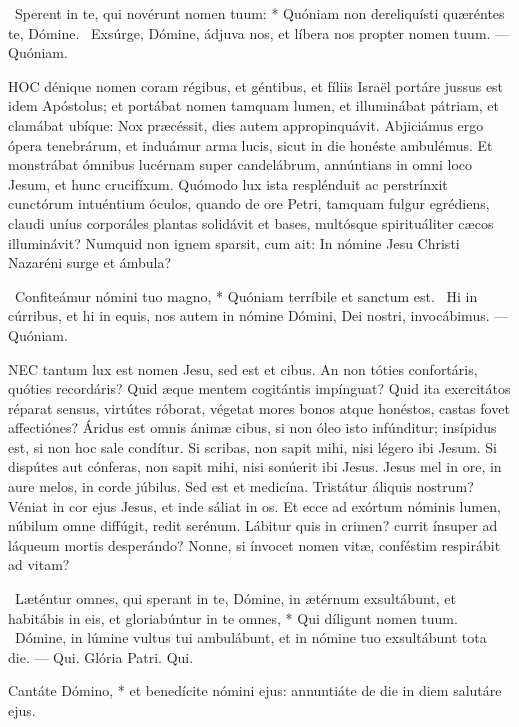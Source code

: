 \R\ Sperent in te, qui novérunt nomen tuum: * Quóniam non dereliquísti quæréntes te, Dómine. \V\ Exsúrge, Dómine, ádjuva nos, et líbera nos propter nomen tuum. --- Quóniam.


\lettrine[lines=2]{H}{OC} dénique nomen coram régibus, et géntibus, et fíliis Israël portáre jussus est idem Apóstolus; et portábat nomen tamquam lumen, et illuminábat pátriam, et clamábat ubíque: Nox præcéssit, dies autem appropinquávit. Abjiciámus ergo ópera tenebrárum, et induámur arma lucis, sicut in die honéste ambulémus. Et monstrábat ómnibus lucérnam super candelábrum, annúntians in omni loco Jesum, et hunc crucifíxum. Quómodo lux ista resplénduit ac perstrínxit cunctórum intuéntium óculos, quando de ore Petri, tamquam fulgur egrédiens, claudi uníus corporáles plantas solidávit et bases, multósque spirituáliter cæcos illuminávit? Numquid non ignem sparsit, cum ait: In nómine Jesu Christi Nazaréni surge et ámbula?

\R\ Confiteámur nómini tuo magno, * Quóniam terríbile et sanctum est. \V\ Hi in cúrribus, et hi in equis, nos autem in nómine Dómini, Dei nostri, invocábimus. --- Quóniam.


\lettrine[lines=2]{N}{EC} tantum lux est nomen Jesu, sed est et cibus. An non tóties confortáris, quóties recordáris? Quid æque mentem cogitántis impínguat? Quid ita exercitátos réparat sensus, virtútes róborat, végetat mores bonos atque honéstos, castas fovet affectiónes? Áridus est omnis ánimæ cibus, si non óleo isto infúnditur; insípidus est, si non hoc sale condítur. Si scribas, non sapit mihi, nisi légero ibi Jesum. Si dispútes aut cónferas, non sapit mihi, nisi sonúerit ibi Jesus. Jesus mel in ore, in aure melos, in corde júbilus. Sed est et medicína. Tristátur áliquis nostrum? Véniat in cor ejus Jesus, et inde sáliat in os. Et ecce ad exórtum nóminis lumen, núbilum omne diffúgit, redit serénum. Lábitur quis in crimen? currit ínsuper ad láqueum mortis desperándo? Nonne, si ínvocet nomen vitæ, conféstim respirábit ad vitam?

\R\ Læténtur omnes, qui sperant in te, Dómine, in ætérnum exsultábunt, et habitábis in eis, et gloriabúntur in te omnes, * Qui díligunt nomen tuum. \V\ Dómine, in lúmine vultus tui ambulábunt, et in nómine tuo exsultábunt tota die. --- Qui. Glória Patri. Qui.


 Cantáte Dómino, * et benedícite nómini ejus: annuntiáte de die in diem salutáre ejus.

